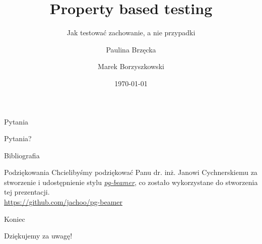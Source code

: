 \documentclass[polish,aspectratio=169]{beamer}
\title[Property based testing]{Property based testing}
\subtitle{Jak testować zachowanie, a nie przypadki}
\author{Paulina Brzęcka \and Marek Borzyszkowski}
\date{\today}
\begin{document}
\pgtitleframe






\begin{frame}{Pytania}
    \begin{center}
        {\huge Pytania?}
    \end{center}
\end{frame}

\begin{frame}[allowframebreaks]{Bibliografia}
    
    
\end{frame}

\begin{frame}{Podziękowania}
    Chcielibyśmy podziękować Panu dr. inż. Janowi Cychnerskiemu za stworzenie 
    i udostępnienie stylu \href{https://github.com/jachoo/pg-beamer}{\emph{pg-beamer}}, 
    co zostało wykorzystane do stworzenia tej prezentacji.\\
    \url{https://github.com/jachoo/pg-beamer}
     
\end{frame}

\begin{frame}{Koniec}
    \begin{center}
        {\huge Dziękujemy za uwagę!}
    \end{center}
\end{frame}

\pglastframe


\end{document}
